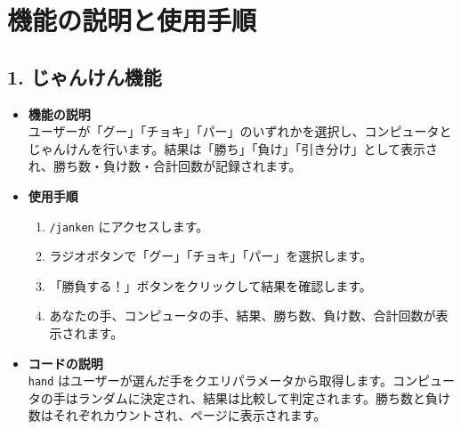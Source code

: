 \documentclass{article}
\begin{document}
\section*{機能の説明と使用手順}
\subsection*{1. じゃんけん機能}
\begin{itemize}
    \item \textbf{機能の説明} \\
    ユーザーが「グー」「チョキ」「パー」のいずれかを選択し、コンピュータとじゃんけんを行います。結果は「勝ち」「負け」「引き分け」として表示され、勝ち数・負け数・合計回数が記録されます。
    
    \item \textbf{使用手順} \\
    \begin{enumerate}
        \item \texttt{/janken} にアクセスします。
        \item ラジオボタンで「グー」「チョキ」「パー」を選択します。
        \item 「勝負する！」ボタンをクリックして結果を確認します。
        \item あなたの手、コンピュータの手、結果、勝ち数、負け数、合計回数が表示されます。
    \end{enumerate}
    
    \item \textbf{コードの説明} \\
    \texttt{hand} はユーザーが選んだ手をクエリパラメータから取得します。コンピュータの手はランダムに決定され、結果は比較して判定されます。勝ち数と負け数はそれぞれカウントされ、ページに表示されます。
\end{itemize}
\end{document}
